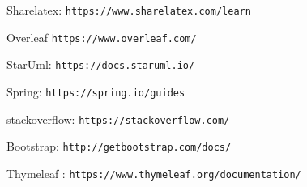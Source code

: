 \documentclass[a4paper,12pt,french]{article}
\begin{document}
\newpage




\newpage


\newpage
\renewcommand\refname{Netographie}
\begin{thebibliography}{9}
Sharelatex: \texttt{https://www.sharelatex.com/learn}

Overleaf \texttt{https://www.overleaf.com/}

StarUml: \texttt{https://docs.staruml.io/}

Spring: \texttt{https://spring.io/guides}

stackoverflow: \texttt{https://stackoverflow.com/}

Bootstrap: \texttt{http://getbootstrap.com/docs/}

Thymeleaf : \texttt{https://www.thymeleaf.org/documentation/}
\end{thebibliography}
\end{document}
